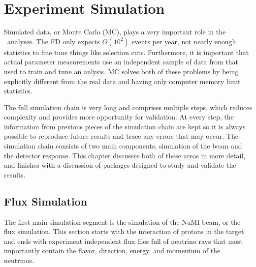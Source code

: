 \chapter{Experiment Simulation}
\label{ch:Simulation}

Simulated data, or Monte Carlo (MC), plays a very important role in the \nova~analyses. The FD only expects $O(10^2)$ events per year, not nearly enough statistics to fine tune things like selection cuts. Furthermore, it is important that actual parameter measurements use an independent sample of data from that used to train and tune an anlysis. MC solves both of these problems by being explicitly different from the real data and having only computer memory limit statistics.

The full simulation chain is very long and comprises multiple steps, which reduces complexity and provides more opportunity for validation. At every step, the information from previous pieces of the simulation chain are kept so it is always possible to reproduce future results and trace any errors that may occur. The simulation chain consists of two main components, simulation of the beam and the detector response. This chapter discusses both of these areas in more detail, and finishes with a discussion of packages designed to study and validate the results.

\section{Flux Simulation}

The first main simulation segment is the simulation of the NuMI beam, or the flux simulation. This section starts with the interaction of protons in the target and ends with experiment independent flux files full of neutrino rays that most importantly contain the flavor, direction, energy, and momentum of the neutrinos.

